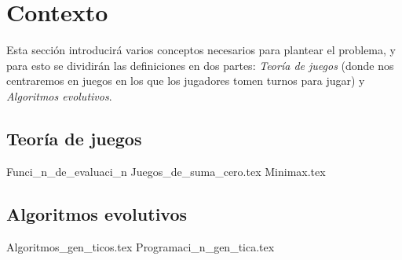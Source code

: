 \section{Contexto}
  Esta sección introducirá varios conceptos necesarios para plantear el problema, y para esto se 
  dividirán las definiciones en dos partes: \textit{Teoría de juegos} (donde nos centraremos en 
  juegos en los que los jugadores tomen turnos para jugar) y \textit{Algoritmos 
  evolutivos}.

  \subsection{Teoría de juegos}    
    {Funci_n_de_evaluaci_n}
    {Juegos_de_suma_cero.tex}
    {Minimax.tex}

  \subsection{Algoritmos evolutivos}
    {Algoritmos_gen_ticos.tex}
    {Programaci_n_gen_tica.tex}